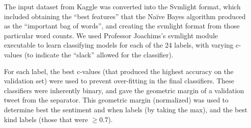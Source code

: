 	The input dataset from Kaggle was converted into the Svmlight format, which included obtaining the ``best features'' that the Naïve Bayes algorithm produced as the ``important bag of words'', and creating the svmlight format from those particular word counts. We used Professor Joachims’s svmlight module executable to learn classifying models for each of the 24 labels, with varying c-values (to indicate the ``slack'' allowed for the classifier). 

	For each label, the best c-values (that produced the highest accuracy on the validation set) were used to prevent over-fitting in the final classifiers. These classifiers were inherently binary, and gave the geometric margin of a validation tweet from the separator. This geometric margin (normalized) was used to determine best the sentiment and when labels (by taking the max), and the best kind labels (those that were $\ge 0.7$).